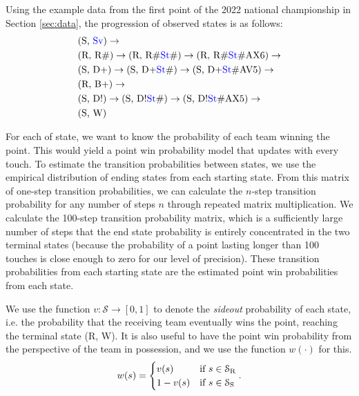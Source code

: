 \documentclass[USenglish]{article}
\theoremstyle{dgthm}
\theoremstyle{dgdef}
\begin{document}
Using the example data from the first point of the 2022 national championship in Section \ref{sec:data}, the progression of observed states is as follows:
\begin{align*}
    &\mbox{(S, \textcolor{blue}{Sv})}  \rightarrow\\
    &\mbox{(R, R\#)} \rightarrow \mbox{(R, R\#\textcolor{blue}{St}\#)} \rightarrow \mbox{(R, R\#\textcolor{blue}{St}\#AX6)} \rightarrow\\
    &\mbox{(S, D+)}  \rightarrow \mbox{(S, D+\textcolor{blue}{St}\#)}  \rightarrow \mbox{(S, D+\textcolor{blue}{St}\#AV5)}  \rightarrow\\
    &\mbox{(R, B+)}  \rightarrow\\
    &\mbox{(S, D!)}  \rightarrow \mbox{(S, D!\textcolor{blue}{St}\#)}  \rightarrow \mbox{(S, D!\textcolor{blue}{St}\#AX5)}  \rightarrow\\
    &\mbox{(S, W)}
\end{align*}

For each of state, we want to know the probability of each team winning the point. This would yield a point win probability model that updates with every touch. To estimate the transition probabilities between states, we use the empirical distribution of ending states from each starting state. From this matrix of one-step transition probabilities, we can calculate the $n$-step transition probability for any number of steps $n$ through repeated matrix multiplication. We calculate the 100-step transition probability matrix, which is a sufficiently large number of steps that the end state probability is entirely concentrated in the two terminal states (because the probability of a point lasting longer than 100 touches is close enough to zero for our level of precision). These transition probabilities from each starting state are the estimated point win probabilities from each state.

We use the function $v: \mathcal{S} \rightarrow [0, 1]$ to denote the {\it sideout} probability of each state, i.e. the probability that the receiving team eventually wins the point, reaching the terminal state (R, W). It is also useful to have the point win probability from the perspective of the team in possession, and we use the function $w(\cdot)$ for this.
\begin{equation*}
    w(s) = \begin{cases}
        v(s)        & \mbox{if } s \in \mathcal{S}_{\mbox{\scriptsize R}}\\
        1 - v(s)    & \mbox{if } s \in \mathcal{S}_{\mbox{\scriptsize S}}
    \end{cases}.
\end{equation*}
\end{document}
